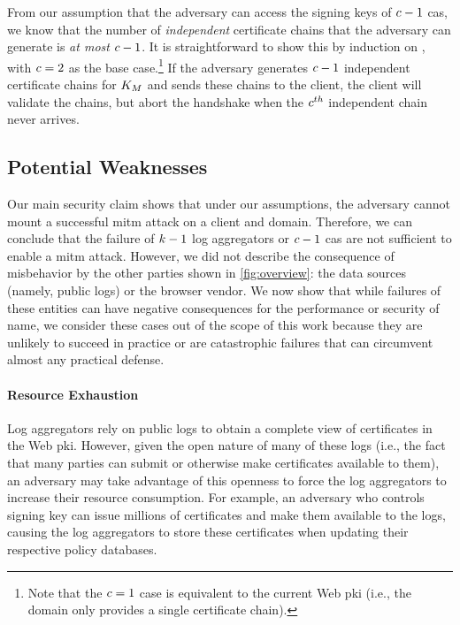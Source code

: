 
From our assumption that the adversary can access the signing keys
of $c - 1$ \acp{ca},
we know that the number of \emph{independent} certificate chains that the adversary can generate
is \emph{at most} $c - 1$. It is straightforward to show this by induction
on \policy, with $c = 2$ as the base case.\footnote{Note that the $c
= 1$ case is equivalent to the current Web \ac{pki} (i.e., the domain only
provides a single certificate chain).} If the adversary generates $c - 1$
independent certificate chains for $K_M$ and sends these chains to
the client, the client will validate the chains, but abort the handshake when
the $c^{th}$ independent chain never arrives.

\subsection{Potential Weaknesses}
\label{sec:analysis:weaknesses}

Our main security claim shows that under our assumptions, the adversary cannot
mount a successful \ac{mitm} attack on a client and domain. Therefore, we can
conclude that the failure of $k - 1$ log aggregators or $c - 1$ \acp{ca} 
are not sufficient to
enable a \ac{mitm} attack. However, we did not describe the consequence of
misbehavior by the other parties shown in \autoref{fig:overview}: the data
sources (namely, public logs) or the browser vendor. We now show that while
failures of these entities can have negative consequences for the performance or
security of \ac{name}, we consider these cases out of the scope of this work
because they are unlikely to succeed in practice or are catastrophic failures
that can circumvent almost any practical defense.

\paragraph{Resource Exhaustion}

Log aggregators rely on public logs to obtain a complete view of certificates in
the Web \ac{pki}. However, given the open nature of many of these logs (i.e.,
the fact that many parties can submit or otherwise make
certificates available to them), an adversary may take advantage of this
openness to force the log aggregators to increase their resource consumption.
For example, an adversary who controls  signing key can issue millions
of certificates and make them available to the logs, causing the log aggregators
to store these certificates when updating their respective policy databases.

